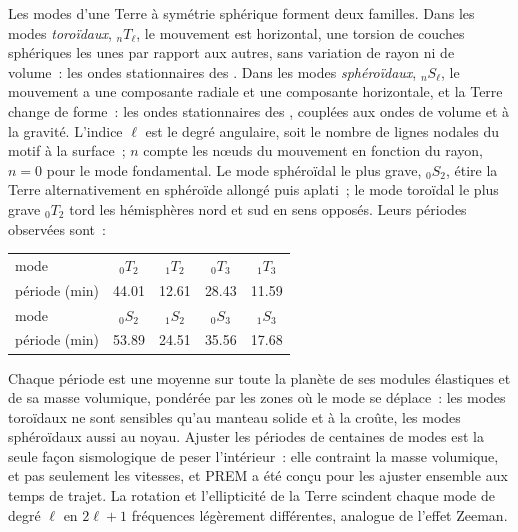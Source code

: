 Les modes d'une Terre à symétrie sphérique forment deux familles. Dans les
modes \emph{toroïdaux}, ${}_nT_\ell$, le mouvement est horizontal, une torsion de
couches sphériques les unes par rapport aux autres, sans variation de rayon ni de volume~: les
ondes stationnaires des . Dans les modes \emph{sphéroïdaux}, ${}_nS_\ell$,
le mouvement a une composante radiale et une composante horizontale, et la Terre change de forme~: les
ondes stationnaires des , couplées aux ondes de volume et à la gravité.
L'indice $\ell$ est le degré angulaire, soit le nombre de lignes nodales du
motif à la surface~; $n$ compte les nœuds du mouvement en fonction du rayon, $n = 0$
pour le mode fondamental. Le mode sphéroïdal le plus grave, ${}_0S_2$, étire la
Terre alternativement en sphéroïde allongé puis aplati~; le mode toroïdal le plus grave
${}_0T_2$ tord les hémisphères nord et sud en sens opposés. Leurs
périodes observées sont~:
\begin{center}
\small
\begin{tabular}{lcccc}
\hline
mode & ${}_0T_2$ & ${}_1T_2$ & ${}_0T_3$ & ${}_1T_3$ \\
période (\unit{min}) & 44.01 & 12.61 & 28.43 & 11.59 \\
\hline
mode & ${}_0S_2$ & ${}_1S_2$ & ${}_0S_3$ & ${}_1S_3$ \\
période (\unit{min}) & 53.89 & 24.51 & 35.56 & 17.68 \\
\hline
\end{tabular}
\end{center}
Chaque période est une moyenne sur toute la planète de ses modules élastiques et
de sa masse volumique, pondérée par les zones où le mode se déplace~: les modes toroïdaux
ne sont sensibles qu'au manteau solide et à la croûte, les modes sphéroïdaux aussi au noyau. Ajuster les
périodes de centaines de modes est la seule façon sismologique de peser
l'intérieur~: elle contraint la masse volumique, et pas seulement les vitesses, et PREM a été conçu pour
les ajuster ensemble aux temps de trajet. La rotation et l'ellipticité
de la Terre scindent chaque mode de degré $\ell$ en $2\ell + 1$
fréquences légèrement différentes, analogue de l'effet Zeeman.

